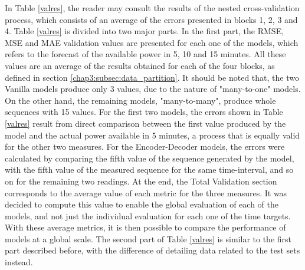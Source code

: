 In Table \ref{valres}, the reader may consult the results of the nested cross-validation process, which consists of an average of the errors presented in blocks 1, 2, 3 and 4. Table \ref{valres} is divided into two major parts. In the first part, the \ac{RMSE}, \ac{MSE} and \ac{MAE} validation values are presented for each one of the models, which refers to the forecast of the available power in 5, 10 and 15 minutes. All these values are an average of the results obtained for each of the four blocks, as defined in section \ref{chap3:subsec:data_partition}. It should be noted that, the two Vanilla models produce only 3 values, due to the nature of "many-to-one" models. On the other hand, the remaining models, "many-to-many", produce whole sequences with 15 values. For the first two models, the errors shown in Table \ref{valres} result from direct comparison between the first value produced by the model and the actual power available in 5 minutes, a process that is equally valid for the other two measures. For the Encoder-Decoder models, the errors were calculated by comparing the fifth value of the sequence generated by the model, with the fifth value of the measured sequence for the same time-interval, and so on for the remaining two readings. At the end, the Total Validation section corresponds to the average value of each metric for the three measures. It was decided to compute this value to enable the global evaluation of each of the models, and not just the individual evaluation for each one of the time targets. With these average metrics, it is then possible to compare the performance of models at a global scale. The second part of Table \ref{valres} is similar to the first part described before, with the difference of detailing data related to the test sets instead.

